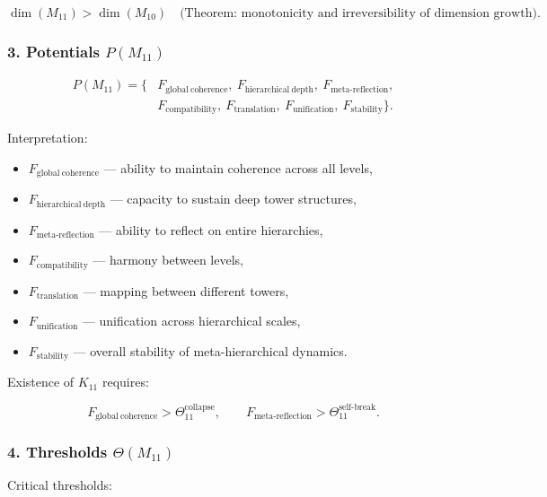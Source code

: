 \[
\dim(M_{11}) > \dim(M_{10})
\quad\text{(Theorem: monotonicity and irreversibility of dimension growth)}.
\]

\subsubsection*{3. Potentials $P(M_{11})$}

\[
\begin{aligned}
P(M_{11}) = \{&
F_{\mathrm{global\ coherence}},\
F_{\mathrm{hierarchical\ depth}},\
F_{\mathrm{meta\mbox{-}reflection}},\\
&
F_{\mathrm{compatibility}},\
F_{\mathrm{translation}},\
F_{\mathrm{unification}},\
F_{\mathrm{stability}}
\}.
\end{aligned}
\]

Interpretation:

\begin{itemize}
    \item $F_{\mathrm{global\ coherence}}$ — ability to maintain
        coherence across all levels,
    \item $F_{\mathrm{hierarchical\ depth}}$ — capacity to sustain deep tower structures,
    \item $F_{\mathrm{meta\mbox{-}reflection}}$ — ability to reflect on entire hierarchies,
    \item $F_{\mathrm{compatibility}}$ — harmony between levels,
    \item $F_{\mathrm{translation}}$ — mapping between different towers,
    \item $F_{\mathrm{unification}}$ — unification across hierarchical scales,
    \item $F_{\mathrm{stability}}$ — overall stability of meta-hierarchical dynamics.
\end{itemize}

Existence of $K_{11}$ requires:

\[
F_{\mathrm{global\ coherence}} > \Theta_{11}^{\mathrm{collapse}},
\qquad
F_{\mathrm{meta\mbox{-}reflection}} > \Theta_{11}^{\mathrm{self\mbox{-}break}}.
\]

\subsubsection*{4. Thresholds $\Theta(M_{11})$}

Critical thresholds:

